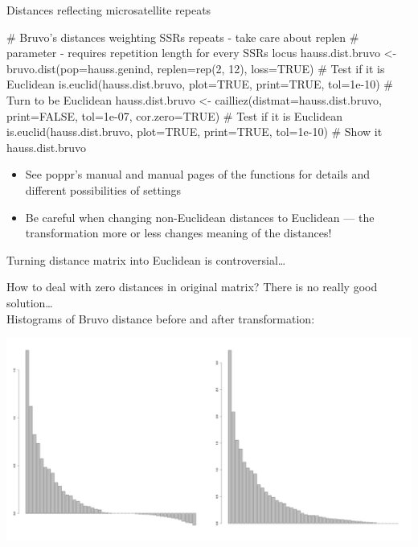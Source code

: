 \documentclass[compress, ucs, xelatex, 11pt, xcolor=svgnames,
	hyperref={
		bookmarks=true,
		unicode=true,
		colorlinks=true,
		pdftitle={Molecular data in R},
		plainpages=false,
		pdfauthor={Vojtech Zeisek},
		pdfsubject={Course about phylogeny and evolution in R},
		pdfcreator={XeLaTeX},
		pdfkeywords={R, evolution, phylogeny, molecular data},
		linkcolor=Tomato,
		anchorcolor=SaddleBrown,
		citecolor=Goldenrod,
		filecolor=DarkMagenta,
		menucolor=Sienna,
		urlcolor=DarkTurquoise,
		pdftex},
	url={hyphens, lowtilde} %
	]{beamer}
\begin{document}
\begin{frame}[fragile]{Distances reflecting microsatellite repeats}
	\begin{spluscode}
    # Bruvo's distances weighting SSRs repeats - take care about replen
    # parameter - requires repetition length for every SSRs locus
    hauss.dist.bruvo <- bruvo.dist(pop=hauss.genind, replen=rep(2, 12),
      loss=TRUE)
    # Test if it is Euclidean
    is.euclid(hauss.dist.bruvo, plot=TRUE, print=TRUE, tol=1e-10)
    # Turn to be Euclidean
    hauss.dist.bruvo <- cailliez(distmat=hauss.dist.bruvo, print=FALSE,
      tol=1e-07, cor.zero=TRUE)
    # Test if it is Euclidean
    is.euclid(hauss.dist.bruvo, plot=TRUE, print=TRUE, tol=1e-10)
    # Show it
    hauss.dist.bruvo
	\end{spluscode}
	\begin{itemize}
		\item See poppr's manual and manual pages of the functions for details and different possibilities of settings
		\item Be careful when changing non-Euclidean distances to Euclidean --- \alert{the transformation more or less changes meaning of the distances!}
	\end{itemize}
\end{frame}

\begin{frame}{Turning distance matrix into Euclidean is controversial\ldots}
	\begin{footnotesize}
		How to deal with zero distances in original matrix? There is no really good solution\ldots\\ Histograms of Bruvo distance before and after transformation:
	\end{footnotesize}
	\begin{center}
		\includegraphics[width=\textwidth]{bruvodist.png}
	\end{center}
\end{frame}
\end{document}
